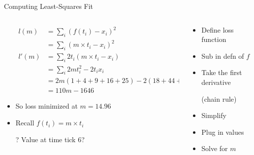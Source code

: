 \documentclass[aspectratio=169]{beamer}
\begin{document}
\begin{frame}{Computing Least-Squares Fit}
\begin{columns} [T]
\begin{column}{0.5\textwidth}
\begin{itemize}
\item[]
 \begin{align}
l(m) &= \sum_i \left(f(t_i) - x_i \right)^2 \nonumber \\
     &= \sum_i \left(m \times t_i - x_i \right)^2 \nonumber \\
l'(m) &= \sum_i 2t_i \left(m \times t_i - x_i \right) \nonumber  \\
      &= \sum_i 2mt_i^2 - 2t_ix_i \nonumber \\
      &= 2m(1 + 4 + 9 + 16 + 25) - 2(18 + 44 + 135 + 196 + 430) \nonumber \\
      &= 110m - 1646 \nonumber 
\end{align}
\item So loss minimized at $m = 14.96$
\item Recall $f(t_i) = m \times t_i$
\item[?] Value at time tick 6? %
\end{itemize}
\end{column}
\begin{column}{0.5\textwidth}
\vspace{1.5em}
\begin{itemize}
\item Define loss function
\vspace{1em}
\item Sub in defn of $f$
\vspace{.5em}
\item Take the first derivative 
\item[] (chain rule)
\item Simplify
\vspace{.5em}
\item Plug in values
\item Solve for $m$
\end{itemize}
\end{column}
\end{columns}
\end{frame}
\end{document}
